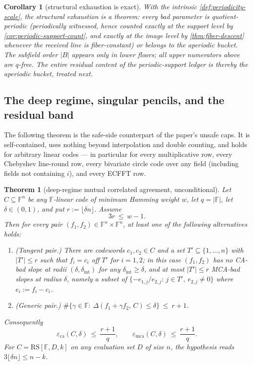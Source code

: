 \documentclass[11pt]{article}
\newtheorem{theorem}{Theorem}[section]
\newtheorem{corollary}[corollary]{Corollary}
\theoremstyle{definition}
\theoremstyle{remark}
\newcommand{\F}{\mathbb{F}}
\newcommand{\B}{B}
\newcommand{\RS}{\mathrm{RS}}
\newcommand{\eca}{\varepsilon_{\mathrm{ca}}}
\newcommand{\emca}{\varepsilon_{\mathrm{mca}}}
\newcommand{\dist}{\Delta}
\begin{document}
\begin{corollary}[structural exhaustion is exact]\label{cor:T1-status}
With the intrinsic \cref{def:periodicity-scale}, the structural exhaustion is a theorem: every bad parameter is quotient-periodic \textup(periodically witnessed, hence counted exactly at the support level by \cref{cor:periodic-support-count}, and exactly at the image level by \cref{thm:fiber-descent} whenever the received line is fiber-constant\textup) or belongs to the aperiodic bucket. The subfield order $|\B|$ appears only in lower floors; all upper numerators above are $q$-free. The entire residual content of the periodic-support ledger is thereby the aperiodic bucket, treated next.
\end{corollary}

\subsection{The deep regime, singular pencils, and the residual band}\label{sec:discharge-T2}

The following theorem is the safe-side counterpart of the paper's unsafe caps. It is self-contained, uses nothing beyond interpolation and double counting, and holds for arbitrary linear codes --- in particular for every multiplicative row, every Chebyshev line-round row, every bivariate circle code over any field \textup(including fields not containing $i$\textup), and every ECFFT row.

\begin{theorem}[deep-regime mutual correlated agreement, unconditional]\label{thm:deep-mca}
Let $C\subseteq\F^n$ be any $\F$-linear code of minimum Hamming weight $w$, let $q=|\F|$, let $\delta\in(0,1)$, and put $r:=\lfloor\delta n\rfloor$. Assume
\[
3r\ \le\ w-1 .
\]
Then for every pair $(f_1,f_2)\in\F^n\times\F^n$, at least one of the following alternatives holds:
\begin{enumerate}[label=\textup{(\alph*)}]
\item \textup{(Tangent pair.)} There are codewords $c_1,c_2\in C$ and a set $T'\subseteq\{1,\dots,n\}$ with $|T'|\le r$ such that $f_i=c_i$ off $T'$ for $i=1,2$; in this case $(f_1,f_2)$ has no CA-bad slope at radii $(\delta,\delta_{\mathrm{int}})$ for any $\delta_{\mathrm{int}}\ge\delta$, and at most $|T'|\le r$ MCA-bad slopes at radius $\delta$, namely a subset of $\{-e_{1,j}/e_{2,j}:\,j\in T',\ e_{2,j}\ne0\}$ where $e_i:=f_i-c_i$.
\item \textup{(Generic pair.)} $\#\{\gamma\in\F:\ \dist(f_1+\gamma f_2,\,C)\le\delta\}\ \le\ r+1$.
\end{enumerate}
Consequently
\[
\eca(C,\delta)\ \le\ \frac{r+1}q,
\qquad
\emca(C,\delta)\ \le\ \frac{r+1}q .
\]
For $C=\RS[\F,D,k]$ on any evaluation set $D$ of size $n$, the hypothesis reads $3\lfloor\delta n\rfloor\le n-k$.
\end{theorem}
\end{document}
